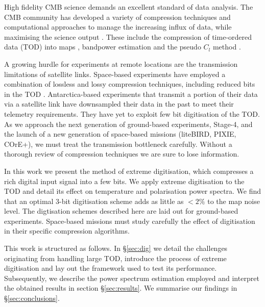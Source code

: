 \documentclass[apj]{emulateapj}
\begin{document}
High fidelity CMB science demands an excellent standard of data analysis. The CMB community has developed a variety of compression techniques and computational approaches to manage the increasing influx of data, while maximising the science output \citep{tristam2007}. These include the compression of time-ordered data (TOD) into maps \citep{tegmark1997}, bandpower estimation \citep{tegmark1998} and the pseudo $C_l$ method \citep{brown2005}.

A growing hurdle for experiments at remote locations are the transmission limitations of satellite links. Space-based experiments have employed a combination of lossless and lossy compression techniques, including reduced bits in the TOD \citep{gaztanaga1998, maris2003}. Antarctica-based experiments that transmit a portion of their data via a satellite link have downsampled their data in the past to meet their telemetry requirements. They have yet to exploit few bit digitisation of the TOD. As we approach the next generation of ground-based experiments, Stage-4, and the launch of a new generation of space-based missions (liteBIRD, PIXIE, COrE+), we must treat the transmission bottleneck carefully. Without a thorough review of compression techniques we are sure to lose information. %

In this work we present the method of extreme digitisation, which compresses a rich digital input signal into a few bits. We apply extreme digitisation to the TOD and detail its effect on temperature and polarisation power spectra. We find that an optimal 3-bit digitisation scheme adds as little as $< 2\%$ to the map noise level. The digtisation schemes described here are laid out for ground-based experiments. Space-based missions must study carefully the effect of digitisation in their specific compression algorithms.%

This work is structured as follows. In \S\ref{sec:dig} we detail the challenges originating from handling large TOD, introduce the process of extreme digitisation and lay out the framework used to test its performance. Subsequently, we describe the power spectrum estimation employed and interpret the obtained results in section \S\ref{sec:results}. We summarise our findings in \S\ref{sec:conclusions}.

\end{document}
